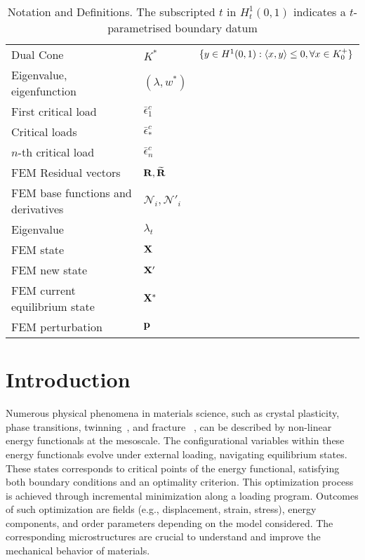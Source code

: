 \begin{table}[h!]
\begin{tabular}{  m{5.5cm}  m{3cm}  m{6cm}  }
    Dual Cone& $K^*$ & $\{y \in H^1(0,1): \langle x,y \rangle \leq 0, \forall x \in K^+_{0}\}$\\
    Eigenvalue, eigenfunction& $(\lambda, w^*)$ & \\
    First critical load & $\bar \epsilon^c_1$ & \\
    Critical loads & $\bar \epsilon^c_*$ & \\
    $n$-th critical load & $\bar \epsilon^c_n$ & \\
    FEM Residual vectors& ${\bf R}, \widetilde{\bf R}$ & \\
    FEM base functions and derivatives  & ${\mathcal N}_i, {\mathcal N}'_i$ & \\
   Eigenvalue & $\lambda_t$ & \\
   FEM state & $\mathbf{X}$ & \\
   FEM new state & $\mathbf{X}'$ & \\
   FEM current equilibrium state & $\mathbf{X^*}$ & \\
   FEM perturbation & $\mathbf{p}$ & \\
  \end{tabular}
  \caption{Notation and Definitions. The subscripted $t$ in $H_t^1(0, 1)$ indicates a $t$-parametrised boundary datum}
\label{table:notation}
\end{table}

\section{Introduction}
Numerous physical phenomena in materials science, such as crystal plasticity, phase transitions, twinning~\cite{Clayton2011-xq}, and fracture ~\cite{francfort_marigo1998,Baldelli2014-ho,Baldelli2021-gc}, can be described by non-linear energy functionals at the mesoscale. 
The configurational variables within these energy functionals evolve under external loading, navigating equilibrium states. These states corresponds to critical points of the energy functional, satisfying both boundary conditions and an optimality criterion.
This optimization process is achieved through incremental minimization along a loading program. Outcomes of such optimization are fields
(e.g., displacement, strain, stress), energy components, and order parameters depending on the model considered. The corresponding microstructures are crucial to understand and improve the mechanical behavior of materials.

